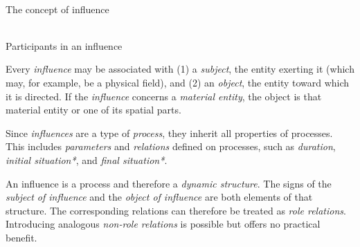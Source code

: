 \begin{frame}{\\The concept of influence}
\topline
\justifying

 \begin{SCn}
	\begin{scnindent}
	\end{scnindent}

\end{SCn}
\end{frame}

\begin{frame}{\\Participants in an influence}
\topline
\justifying
\begin{SCn}


\end{SCn}
\end{frame}

\begin{frame}{}
\topline
\justifying
    Every \textit{influence} may be associated with (1) a \textit{subject\scnrolesign}, the entity exerting it (which may, for example, be a physical field), and (2) an \textit{object\scnrolesign}, the entity toward which it is directed. If the \textit{influence} concerns a \textit{material entity}, the object is that material entity or one of its spatial parts.
\end{frame}

\begin{frame}{}
\topline
\justifying

Since \textit{influences} are a type of \textit{process}, they inherit all properties of processes. This includes \textit{parameters} and \textit{relations} defined on processes, such as \textit{duration\scnsupergroupsign}, \textit{initial situation*}, and \textit{final situation*}.

\bigskip

An influence is a process and therefore a \textit{dynamic structure}. The signs of the \textit{subject of influence\scnrolesign} and the \textit{object of influence\scnrolesign} are both elements of that structure. The corresponding relations can therefore be treated as \textit{role relations}. Introducing analogous \textit{non-role relations} is possible but offers no practical benefit.
\end{frame}

